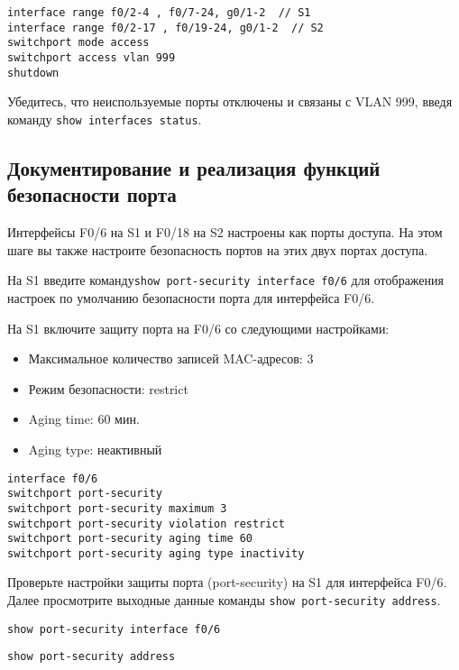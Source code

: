 \begin{verbatim}
interface range f0/2-4 , f0/7-24, g0/1-2  // S1
interface range f0/2-17 , f0/19-24, g0/1-2  // S2
switchport mode access
switchport access vlan 999
shutdown
\end{verbatim}

Убедитесь, что неиспользуемые порты отключены и связаны с VLAN 999,
введя команду \texttt{show interfaces status}.

\subsection{Документирование и реализация функций безопасности порта}

Интерфейсы F0/6 на S1 и F0/18 на S2 настроены как порты доступа.
На этом шаге вы также настроите безопасность портов
на этих двух портах доступа.

На S1 введите команду\texttt{show port-security interface f0/6}
для отображения настроек по умолчанию безопасности порта для интерфейса F0/6.

На S1 включите защиту порта на F0/6 со следующими настройками:

\begin{itemize}
    \item Максимальное количество записей MAC-адресов: 3
    \item Режим безопасности: restrict
    \item Aging time: 60 мин.
    \item Aging type: неактивный
\end{itemize}

\begin{verbatim}
interface f0/6
switchport port-security
switchport port-security maximum 3
switchport port-security violation restrict
switchport port-security aging time 60
switchport port-security aging type inactivity
\end{verbatim}

Проверьте настройки защиты порта (port-security) на S1 для интерфейса F0/6.
Далее просмотрите выходные данные команды \texttt{show port-security address}.

\begin{verbatim}
show port-security interface f0/6
\end{verbatim}

\begin{verbatim}
show port-security address
\end{verbatim}


